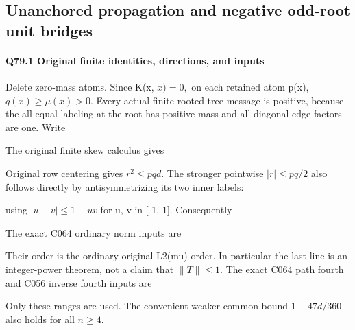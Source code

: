\subsection{Unanchored propagation and negative odd-root unit bridges}\label{proof:Q5-C079}
\paragraph{Q79.1 Original finite identities, directions, and inputs}

Delete zero-mass atoms. Since K(x, \(x)=0,\allowbreak \) on each retained atom
p(x), \(q(x)\ge \mu(x)>0.\) Every actual finite rooted-tree message is
positive, because the all-equal labeling at the root has positive
mass and all diagonal edge factors are one. Write


The original finite skew calculus gives


Original row centering gives \(r^2\le pqd.\) The stronger pointwise
\(|r|\le pq/2\) also follows directly by antisymmetrizing its two inner
labels:


using \(|u-v|\le 1-uv\) for u, v in [-1, 1]. Consequently


The exact C064 ordinary norm inputs are


Their order is the ordinary original L2(mu) order. In particular the
last line is an integer-power theorem, not a claim that \(\lVert T\rVert \le 1.\)
The exact C064 path fourth and C056 inverse fourth inputs are


Only these ranges are used. The convenient weaker common bound $1-47d/360$ also holds for all $n\ge4$. 


